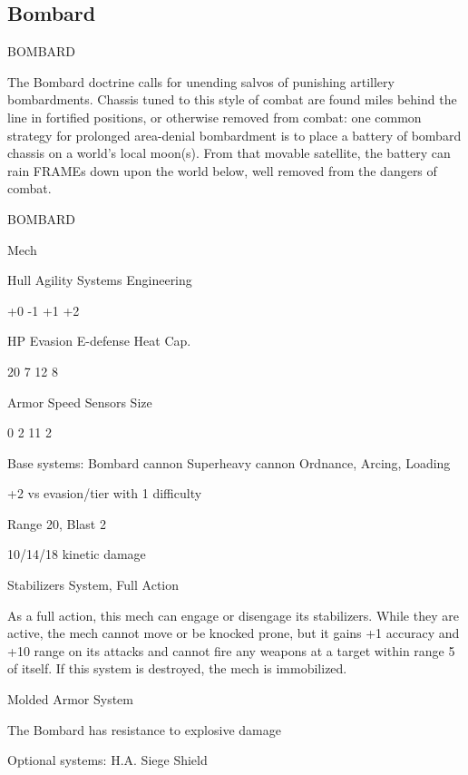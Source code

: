 \subsection{Bombard}

                                             BOMBARD  

The Bombard doctrine calls for unending salvos of punishing artillery bombardments. Chassis  
tuned to this style of combat are found miles behind the line in fortified positions, or otherwise  
removed from combat: one common strategy for prolonged area-denial bombardment is to place  
a battery of bombard chassis on a world’s local moon(s). From that movable satellite, the battery  
can rain FRAMEs down upon the world below, well removed from the dangers of combat. 
 

       BOMBARD 

       Mech 

       Hull      Agility     Systems       Engineering 

       +0        -1          +1            +2 

       HP        Evasion     E-defense     Heat Cap. 

       20        7            12           8 

      Armor      Speed       Sensors       Size 

       0         2            11           2 

Base systems:  
Bombard cannon  
Superheavy cannon  
Ordnance, Arcing, Loading
 
+2 vs evasion/tier with 1 difficulty
 
Range 20, Blast 2
 
10/14/18 kinetic damage
 

Stabilizers  
System, Full Action
 
As a full action, this mech can engage or disengage its stabilizers. While they are active, the  
mech cannot move or be knocked prone, but it gains +1 accuracy and +10 range on its attacks  
and cannot fire any weapons at a target within range 5 of itself. If this system is destroyed, the  
mech is immobilized.
 

Molded Armor  
System
 
The Bombard has resistance to explosive damage
 

Optional systems:  
H.A. Siege Shield  

                                                                                                       


